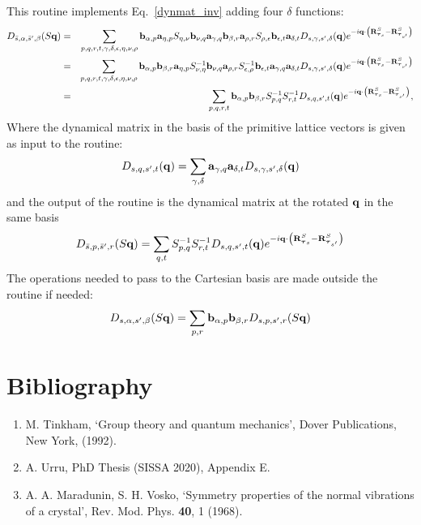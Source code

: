 \documentclass[12pt,a4paper,twoside]{report}
\begin{document}
This routine implements Eq.~\ref{dynmat_inv} adding four
$\delta$ functions:
\begin{eqnarray}
D_{\bar s,\alpha,\bar s',\beta}(S{\bf q}) &=&
\sum_{p,q,r,t,\gamma,\delta,\epsilon,\eta,\nu,\rho}  {\bf b}_{\alpha,p} {\bf a}_{\eta,p}S_{\eta,\nu}{\bf b}_{\nu,q} {\bf a}_{\gamma,q} {\bf b}_{\beta,r} {\bf a}_{\rho,r} S_{ \rho,\epsilon} {\bf b}_{\epsilon,t} {\bf a}_{\delta,t}
D_{s,\gamma,s',\delta}({\bf q})
e^{-i {\bf q} \cdot \left({\bf R}^{S}_{\boldsymbol{\tau}_s} - {\bf R}^{S}_{\boldsymbol{\tau}_{s'}}\right)}
\nonumber \\ &=&
\sum_{p,q,r,t,\gamma,\delta,\epsilon,\eta,\nu,\rho}  {\bf b}_{\alpha,p}{\bf b}_{\beta,r}  {\bf a}_{\eta,p}S^{-1}_{\nu,\eta}{\bf b}_{\nu,q}  {\bf a}_{\rho,r} S^{-1}_{ \epsilon,\rho} {\bf b}_{\epsilon,t} {\bf a}_{\gamma,q} {\bf a}_{\delta,t}
D_{s,\gamma,s',\delta}({\bf q})
e^{-i {\bf q} \cdot \left({\bf R}^{S}_{\boldsymbol{\tau}_s} - {\bf R}^{S}_{\boldsymbol{\tau}_{s'}}\right)}
\nonumber \\
&=&
\sum_{p,q,r,t}  {\bf b}_{\alpha,p}{\bf b}_{\beta,r}  S^{-1}_{p,q} S^{-1}_{r,t} 
D_{s,q,s',t}({\bf q})
e^{-i {\bf q} \cdot \left({\bf R}^{S}_{\boldsymbol{\tau}_s} - {\bf R}^{S}_{\boldsymbol{\tau}_{s'}}\right)}
,
\label{dynmat_inv_cryst}
\end{eqnarray}
Where the dynamical matrix in the basis of the primitive lattice vectors is given as input to the routine:
\begin{equation}
D_{s,q,s',t}({\bf q})= \sum_{\gamma,\delta}
 {\bf a}_{\gamma,q} {\bf a}_{\delta,t}
D_{s,\gamma,s',\delta}({\bf q})
\end{equation}
and the output of the routine is the dynamical matrix
at the rotated ${\bf q}$
in the same basis
\begin{equation}
D_{\bar s,p,\bar s',r}(S{\bf q})=
\sum_{q,t}  S^{-1}_{p,q} S^{-1}_{r,t} 
D_{s,q,s',t}({\bf q})
e^{-i {\bf q} \cdot \left({\bf R}^{S}_{\boldsymbol{\tau}_s} - {\bf R}^{S}_{\boldsymbol{\tau}_{s'}}\right)}
\end{equation}
The operations needed to pass to the Cartesian basis 
are made outside the routine if needed:
\begin{equation}
D_{s,\alpha,s',\beta}(S{\bf q})
=\sum_{p,r}  {\bf b}_{\alpha,p}{\bf b}_{\beta,r}
D_{s,p,s',r}(S{\bf q})
\end{equation}

{\color{dark-blue}\chapter{Bibliography}}
\color{black}

\begin{enumerate}

\item
M. Tinkham, `Group theory and quantum mechanics', Dover Publications, New York,
(1992). 

\item
A. Urru, PhD Thesis (SISSA 2020), Appendix E.

\item 
A. A. Maradunin, S. H. Vosko, `Symmetry properties of the normal vibrations of a crystal', Rev. Mod. Phys.
{\bf 40}, 1 (1968).
\end{enumerate}
\end{document}
